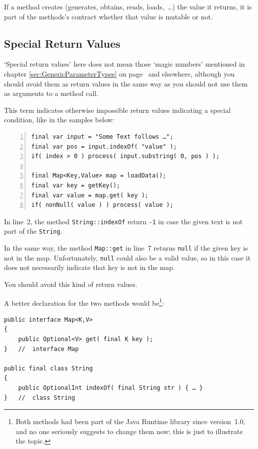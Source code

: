 \documentclass[11pt,a4paper, titlepage, parskip=half, headsepline, footsepline, cleardoublepage=current, headheight=1cm]{scrbook}
\newcommand*{\tqvref}[1]{\hyperref[{#1}]{\ref*{#1}} on page~\pageref{#1}}
\begin{document}
If a method creates (generates, obtains, reads, loads,~…) the value it returns, it is part of the methods's contract whether that value is mutable or not.


\subsection{Special Return Values}\label{sec:SpecialReturnValues}
‘Special return values’ here does not mean those ‘magic numbers’ mentioned in chapter \tqvref{sec:GenericParameterTypes} and elsewhere, although you should avoid them as return values in the same way as you should not use them as arguments to a method call.

This term indicates otherwise impossible return values indicating a special condition, like in the samples below:
\begin{lstlisting}[numbers=left]
final var input = "Some Text follows …";
final var pos = input.indexOf( "value" );
if( index > 0 ) process( input.substring( 0, pos ) );

final Map<Key,Value> map = loadData();
final var key = getKey();
final var value = map.get( key );
if( nonNull( value ) ) process( value );
\end{lstlisting}
In line~2, the method \lstinline|String::indexOf|\autocite{ORACLE_DOC_STRING:indexOf} return \verb#-1# in case the given text is not part of the \lstinline|String|.

In the same way, the method \lstinline|Map::get|\autocite{ORACLE_DOC_MAP:get} in line~7 returns \lstinline|null| if the given key is not in the map. Unfortunately, \lstinline|null| could also be a valid value, so in this case it does not necessarily indicate that key is not in the map.

You should avoid this kind of return values.

A better declaration for the two methods would be\footnote{Both methods had been part of the Java Runtime library since version~1.0, and no one seriously suggests to change them now; this is just to illustrate the topic.}:
\begin{lstlisting}
public interface Map<K,V>
{
    public Optional<V> get( final K key );
}   //  interface Map

public final class String
{
    public OptionalInt indexOf( final String str ) { … }
}   //  class String
\end{lstlisting}
\end{document}
